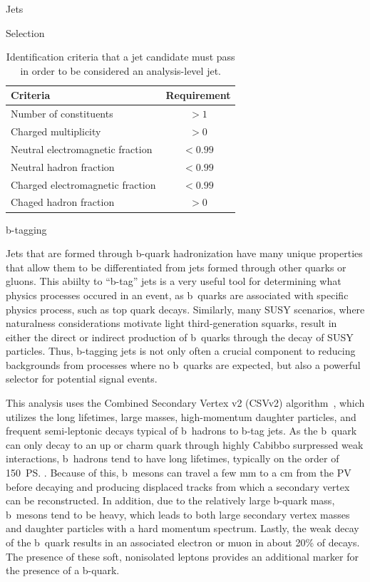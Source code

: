 \begin{section}{Jets}
\begin{subsection}{Selection}
\begin{table}[tb!]
\centering
\begin{tabular}{l|c}
\hline \hline
Criteria                          &  Requirement \\
\hline
Number of constituents            &  $> 1$       \\
Charged multiplicity              &  $> 0$       \\
Neutral electromagnetic fraction  &  $< 0.99$    \\
Neutral hadron fraction           &  $< 0.99$    \\
Charged electromagnetic fraction  &  $< 0.99$    \\
Chaged hadron fraction            &  $> 0$       \\
\hline\hline
\end{tabular}
\caption{Identification criteria that a jet candidate must pass in order to be considered an analysis-level jet.}
\label{tab:jet_id}
\end{table}

\end{subsection}

\begin{subsection}{b-tagging}

Jets that are formed through b-quark hadronization have many unique properties that allow them to be differentiated from jets formed through other quarks or gluons.
This abiilty to ``b-tag'' jets is a very useful tool for determining what physics processes occured in an event, as b~quarks are associated with specific physics process, such as top quark decays.
Similarly, many SUSY scenarios, where naturalness considerations motivate light third-generation squarks, result in either the direct or indirect production of b~quarks through the decay of SUSY particles.
Thus, b-tagging jets is not only often a crucial component to reducing backgrounds from processes where no b~quarks are expected, but also a powerful selector for potential signal events. 

This analysis uses the Combined Secondary Vertex v2 (CSVv2) algorithm~\cite{Chatrchyan:2012jua,Sirunyan:2017ezt}, which utilizes the long lifetimes, large masses, high-momentum daughter particles, and frequent semi-leptonic decays typical of b~hadrons to b-tag jets.
As the b~quark can only decay to an up or charm quark through highly Cabibbo surpressed weak interactions, b~hadrons tend to have long lifetimes, typically on the order of 150~\ps.
Because of this, b~mesons can travel a few mm to a cm from the PV before decaying and producing displaced tracks from which a secondary vertex can be reconstructed.
In addition, due to the relatively large b-quark mass, b~mesons tend to be heavy, which leads to both large secondary vertex masses and daughter particles with a hard momentum spectrum.
Lastly, the weak decay of the b~quark results in an associated electron or muon in about 20\% of decays.
The presence of these soft, nonisolated leptons provides an additional marker for the presence of a b-quark.


\end{subsection}
\end{section}

